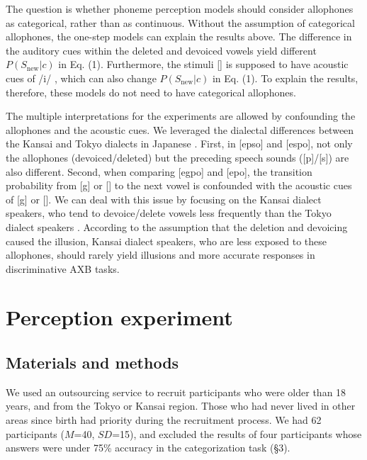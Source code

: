 \documentclass[a4paper,11pt,twocolumn]{article}
\begin{document}
The question is whether phoneme perception models should consider allophones as categorical, rather than as continuous. Without the assumption of categorical allophones, the one-step models can explain the results above. The difference in the auditory cues within the deleted and devoiced vowels yield different $P(S_{\text{new}}|c)$ in Eq. (1). Furthermore, the stimuli [\textctc] is supposed to have acoustic cues of /i/ \cite{kubozono1999japanese_eng}, which can also change $P(S_{\text{new}}|c)$ in Eq. (1). To explain the results, therefore, these models do not need to have categorical allophones.

The multiple interpretations for the experiments are allowed by confounding the allophones and the acoustic cues. We leveraged the dialectal differences between the Kansai and Tokyo dialects in Japanese \cite{kishiyama2022onestep}. First, in [ep\textsubring{\textturnm}so] and [espo], not only the allophones (devoiced/deleted) but the preceding speech sounds ([p]/[s]) are also different. Second, when comparing [egpo] and [e\textctc{}po], the transition probability from [g] or [\textctc] to the next vowel is confounded with the acoustic cues of [g] or [\textctc]. We can deal with this issue by focusing on the Kansai dialect speakers, who tend to devoice/delete vowels less frequently than the Tokyo dialect speakers \cite{byun2011_eng, byun2012_eng}. According to the assumption that the deletion and devoicing caused the illusion, Kansai dialect speakers, who are less exposed to these allophones, should rarely yield illusions and more accurate responses in discriminative AXB tasks.

\section{Perception experiment}

\subsection{Materials and methods}

We used an outsourcing service to recruit participants who were older than 18 years, and from the Tokyo or Kansai region. Those who had never lived in other areas since birth had priority during the recruitment process. We had 62 participants ($M$=40, $SD$=15), and excluded the results of four participants whose answers were under 75\% accuracy in the categorization task (\S3).
\end{document}
